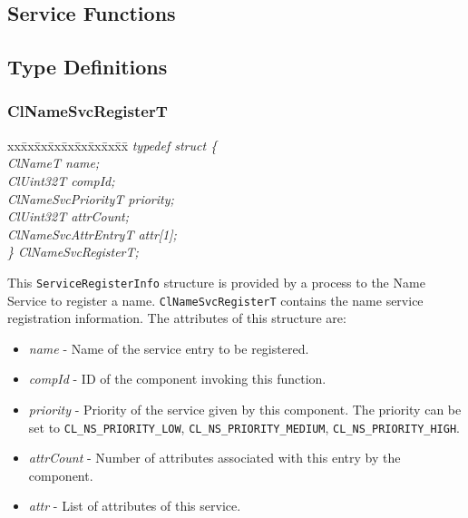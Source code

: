 \begin{flushleft}
\chapter{Service Functions}


\section{Type Definitions}
\subsection{ClNameSvcRegisterT}
\begin{tabbing}
xx\=xx\=xx\=xx\=xx\=xx\=xx\=xx\=xx\=\kill
\textit{typedef struct \{}\\
\>\>\>\>\textit{ClNameT                       name;}\\
\>\>\>\>\textit{ClUint32T                      compId;}\\
\>\>\>\>\textit{ClNameSvcPriorityT     priority;}\\
\>\>\>\>\textit{ClUint32T                     attrCount;}\\
\>\>\>\>\textit{ClNameSvcAttrEntryT   attr[1];}\\
\textit{\} ClNameSvcRegisterT;}\end{tabbing}
This {\tt{ServiceRegisterInfo}} structure is provided by a process to the Name Service to register a name. {\tt{ClNameSvcRegisterT}} contains the name service 
registration information.  The attributes of this structure are:
\begin{itemize}
\item
\textit{name} -  Name of the service entry to be registered.
\item
\textit{compId} - ID of the component invoking this function. 
\item
\textit{priority} - Priority of the service given by this component. The priority can be set to {\tt{CL\_\-NS\_\-PRIORITY\_\-LOW}}, 
{\tt{CL\_\-NS\_\-PRIORITY\_\-MEDIUM}}, {\tt{CL\_\-NS\_\-PRIORITY\_\-HIGH}}. 
\item
\textit{attrCount} - Number of attributes associated with this entry by the component.
\item
\textit{attr} - List of attributes of this service.
\end{itemize}






\end{flushleft}
